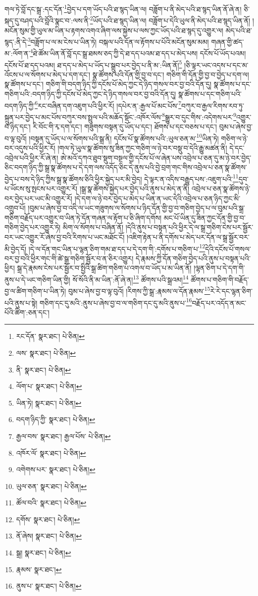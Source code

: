 གལ་ཏེ་བློ་དང་སྒྲ་:དང་དོན་\footnote{རང་དོན་  སྣར་ཐང་།  པེ་ཅིན། }བྱེད་པ་དག་ཡོད་པའི་ཐ་སྙད་ཡིན་ལ། བཟློག་པ་ནི་མེད་པའི་ཐ་སྙད་ཡིན་ནོ་ཞེ་ན། ཅི་སྐད་དུ་བཤད་པའི་བློའི་སྣང་བ་:ལས་ནི་\footnote{ལས་  སྣར་ཐང་།  པེ་ཅིན། }ཡོད་པའི་ཐ་སྙད་ཡིན་ལ། བཟློག་པ་དེའི་ཡུལ་ནི་མེད་པའི་ཐ་སྙད་ཡིན་ནོ། །མངོན་སུམ་གྱི་ཡུལ་མ་ཡིན་པ་རྟགས་འགའ་ཞིག་ལས་སྐྱེས་པ་ལས་ཀྱང་ཡོད་པའི་ཐ་སྙད་དུ་འགྱུར་ལ། མེད་པའི་ཐ་སྙད་:ནི་དེ་\footnote{ནི་  སྣར་ཐང་།  པེ་ཅིན། }བཟློག་པ་ལ་མ་ངེས་པ་ཡིན་ཏེ། བསྐལ་པའི་དོན་ལ་རྟོགས་པ་པོའི་མངོན་སུམ་མམ། གཞན་གྱི་ཚད་མ་:ལོག་ན་\footnote{ལོག་པ་  སྣར་ཐང་།  པེ་ཅིན། }ཐེ་ཚོམ་ཡིན་ནོ་བློ་དང་སྒྲ་ཐམས་ཅད་ཀྱི་དེ་ཐ་དད་པའམ་ཐ་དད་པ་མེད་པས། དངོས་པོ་ཡོད་པའམ། དངོས་པོ་ཐ་དད་པའམ། ཐ་དད་པ་མེད་པ་ཡོད་པ་སྒྲུབ་པར་བྱེད་པ་ནི་མ་:ཡིན་ནོ།\footnote{ཡིན་ཏེ།  སྣར་ཐང་།  པེ་ཅིན། } །ཅི་ལྟར་ཡང་འདས་པ་དང་མ་འོངས་པ་ལ་སོགས་པ་མེད་པ་དག་དང་། སྣ་ཚོགས་པའི་དོན་གྱི་བྱ་བ་དང་། གཅིག་གི་དོན་གྱི་བྱ་བ་བྱེད་པ་དག་ལ། སྣ་ཚོགས་པ་དང་། གཅིག་གི་བདག་ཉིད་ཀྱི་དངོས་པོ་མེད་ཀྱང་དེ་ཉིད་གསལ་བར་བྱ་བའི་དོན་དུ། སྣ་ཚོགས་པ་དང་གཅིག་པའི་:བདག་ཉིད་ཀྱི་དངོས་པོ་མེད་ཀྱང་དེ་ཉིད་གསལ་བར་བྱ་བའི་དོན་དུ། སྣ་ཚོགས་པ་དང་གཅིག་པའི་བདག་ཉིད་ཀྱི་\footnote{བདག་ཉིད་ཀྱི་  སྣར་ཐང་།  པེ་ཅིན། }རང་བཞིན་དག་འཇུག་པའི་ཕྱིར་རོ། །དཔེར་ན་:རྒྱལ་པོ་མང་པོས་\footnote{རྒྱལ་བས་  སྣར་ཐང་། རྒྱལ་པོས་  པེ་ཅིན། }བཀུར་བ་རྒྱལ་རིགས་རབ་ཏུ་སྐྲུན་པར་བྱེད་པ་མང་པོས་བཀུར་བས་སྤྲུལ་པའི་མཆོད་སྡོང་:འཁོར་ལོས་\footnote{འཁོར་ལོ་  སྣར་ཐང་།  པེ་ཅིན། }སྒྱུར་བ་དུང་གིས་:འདེགས་པར་\footnote{འགེགས་པར་  སྣར་ཐང་།  པེ་ཅིན། }འགྱུར་བ་ཉིད་དང་། རི་བོང་གི་རྭ་དག་དང་། གཟུགས་བསྟན་དུ་ཡོད་པ་དང་། ཐོགས་པ་དང་བཅས་པ་དང་། བུམ་པ་ཞེས་བྱ་བ་ལྟ་བུའོ། །བསྟན་དུ་ཡོད་པ་ལ་སོགས་པའི་སྒྲ་ནི། དངོས་པོ་སྣ་ཚོགས་པའི་:ཡུལ་ཅན་མ་\footnote{ཡུལ་ཅན་  སྣར་ཐང་།  པེ་ཅིན། }ཡིན་ཏེ། གཅིག་ལ་ཉེ་བར་འདུས་པའི་ཕྱིར་རོ། །གལ་ཏེ་ཡུལ་སྣ་ཚོགས་སུ་ཟིན་ཀྱང་གཅིག་ལ་ཉེ་བར་བསྡུ་བ་དེའི་རྒྱུ་མཚན་ནི། དེ་དང་འབྲེལ་པའི་ཕྱིར་རོ་ཞེ་ན། ཨེ་མའོ་དཀའ་ཐུབ་སྡུག་བསྔལ་གྱི་དངོས་པོ་ལ་ཞེན་པས་འབྲེལ་པ་ཅན་དུ་མ་ཉེ་བར་བྱེད་ཅིང་བདག་ཉིད་ཀྱི་སྒྲ་སྣ་ཚོགས་པ་དེ་དག་ལས་འདོད་ཅིང་དེ་ནུས་པའི་བྱེ་བྲག་གང་གིས་འབྲེལ་པ་ཅན་སྣ་ཚོགས་བྱེད་པ་བས་དེ་ཉིད་ཀྱིས་སྒྲ་སྣ་ཚོགས་ཅིའི་ཕྱིར་སྐྱེད་པར་མི་བྱེད། དེ་ལྟར་ན་འདིས་བརྒྱུད་པས་:འཇུག་པའི་\footnote{ཚོལ་བའི་  སྣར་ཐང་།  པེ་ཅིན། }དུབ་པ་ཡོངས་སུ་སྤངས་པར་འགྱུར་རོ། །སྒྲ་སྣ་ཚོགས་སྐྱེད་པར་བྱེད་པའི་ནུས་པ་མེད་ན་ནི། འབྲེལ་པ་ཅན་སྣ་ཚོགས་ཉེ་བར་བྱེད་པར་ཡང་མི་འགྱུར་རོ། །དེ་དག་ལ་ཉེ་བར་བྱེད་པ་མེད་པ་ཡིན་ན་ཡང་དེའི་འབྲེལ་པ་ཅན་ཉིད་ཀྱང་མི་འགྲུབ་པོ། །བུམ་པ་ཞེས་བྱ་བ་འདི་ལ་ཡང་གཟུགས་ལ་སོགས་པ་ཉིད་དོན་གྱི་བྱ་བ་གཅིག་བྱེད་པ་ལ་བུམ་པའི་སྒྲ་གཅིག་བརྗོད་པར་འགྱུར་བ་ཡིན་ཏེ་དོན་གཞན་ལ་རྟོག་པ་ཅི་ཞིག་དགོས། མང་པོ་ཡིན་དུ་ཟིན་ཀྱང་དོན་གྱི་བྱ་བ་གཅིག་བྱེད་པར་འགྱུར་ཏེ། མིག་ལ་སོགས་པ་བཞིན་ནོ། །དེའི་ནུས་པ་བསྟན་པའི་ཕྱིར་དེ་ལ་སྒྲ་གཅིག་ངེས་པར་སྦྱོར་བར་ཡང་འགྱུར་རོ་ཞེས་བྱ་བའི་རིགས་པ་ཡང་མཐོང་ངོ། །འཇིག་རྟེན་པ་ནི་དགོས་པ་མེད་པར་དོན་ལ་སྒྲ་སྦྱོར་བར་མི་བྱེད་དོ། །དེ་ལ་དོན་གང་ཡིན་པ་ལྷན་ཅིག་གམ་ཐ་དད་པ་དེ་དག་གི་:དགོས་པ་གཅིག་པ་\footnote{དགོས་  སྣར་ཐང་།  པེ་ཅིན། }དེའི་དངོས་པོ་གསལ་བར་བྱ་བའི་ཕྱིར་གང་གི་ཚེ་སྒྲ་གཅིག་སྦྱོར་བ་ན་ཅིར་འགྱུར། དེ་རྣམས་ཀྱི་དོན་གཅིག་བྱེད་པའི་ནུས་པ་བསྟན་པའི་ཕྱིར། སྒྲ་དེ་རྣམས་ངེས་པར་སྦྱོར་བ་སྤྱིའི་སྒྲ་ཚིག་གཅིག་པ་འགལ་བ་ཡོད་པ་མ་ཡིན་ནོ། །ལྷན་ཅིག་པ་དེ་དག་གི་ནུས་པ་དེ་ཡང་གཅིག་ཡིན་གྱི། སོ་སོའི་ནི་མ་ཡིན་:ནོ་ཞེ་ན།\footnote{ནོ་ཞེས།  སྣར་ཐང་།  པེ་ཅིན། } ཚོགས་པའི་སྒྲའམ།\footnote{སྒྲ།  སྣར་ཐང་།  པེ་ཅིན། } ཚོགས་པ་གཅིག་གི་བརྗོད་བྱ་ལ་ཚིག་གཅིག་པ་ཡིན་ཏེ། བུམ་པ་ཞེས་བྱ་བ་ལྟ་བུའོ། །རིགས་ཀྱི་སྒྲ་:རྣམས་ལ་དོན་རྣམས་\footnote{རྣམས་  སྣར་ཐང་། }རེ་རེ་དང་ལྷན་ཅིག་པའི་ནུས་པ་སྟེ། གཅིག་དང་དུ་མའི་:ནུས་པ་ཞེས་བྱ་བ་ལ་གཅིག་དང་དུ་མའི་ནུས་པ་\footnote{ནུས་པ་  སྣར་ཐང་།  པེ་ཅིན། }བརྗོད་པར་འདོད་ན་མང་པོའི་ཚིག་:ཅན་དང་། 